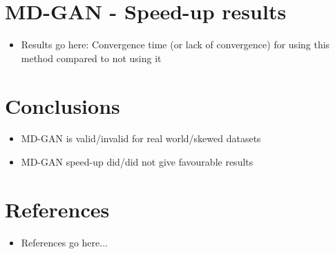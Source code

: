 \documentclass[11pt]{article}       %
\newenvironment{slide}[1]        {\section{#1} \begin{itemize}}%
                                 {\end{itemize}}
\begin{document}
\begin{slide}{MD-GAN - Speed-up results}
\item Results go here: Convergence time (or lack of convergence) for using this method compared to not using it
\end{slide}

\begin{slide}{Conclusions}
\item MD-GAN is valid/invalid for real world/skewed datasets
\item MD-GAN speed-up did/did not give favourable results
\end{slide}

\begin{slide}{References}
\item References go here...
\end{slide}



\end{document}
